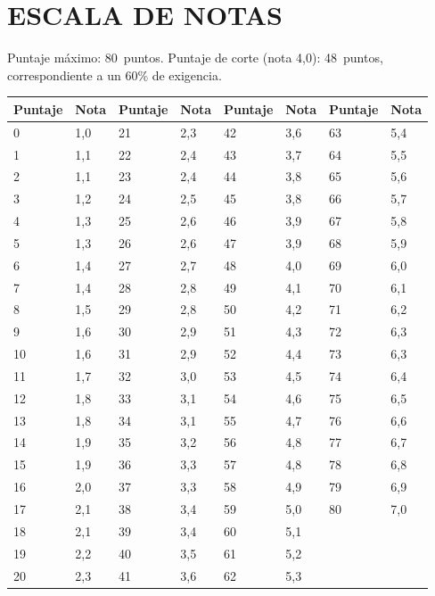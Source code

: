 \documentclass[12pt]{article}
\newcommand{\pmax}{80} %
\newcommand{\pcorte}{48} %
\begin{document}
\section*{ESCALA DE NOTAS}
\noindent
Puntaje máximo: \pmax\ puntos. Puntaje de corte (nota 4,0): \pcorte\ puntos, correspondiente a un 60\% de exigencia.
\vspace{0.3cm}
\begin{center}
\small
\begin{tabular}{|p{1.3cm}|p{1.3cm}|p{1.3cm}|p{1.3cm}|p{1.3cm}|p{1.3cm}|p{1.3cm}|p{1.3cm}| }
\hline
 Puntaje&  Nota&  Puntaje&  Nota&  Puntaje&  Nota&  Puntaje&  Nota \\ \hline
0	&	\color{red}1,0	&	21	&	\color{red}2,3	&	42	&	\color{red}3,6	&	63	&	5,4\\ \hline
1	&	\color{red}1,1	&	22	&	\color{red}2,4	&	43	&	\color{red}3,7	&	64	&	5,5\\ \hline
2	&	\color{red}1,1	&	23	&	\color{red}2,4	&	44	&	\color{red}3,8	&	65	&	5,6\\ \hline
3	&	\color{red}1,2	&	24	&	\color{red}2,5	&	45	&	\color{red}3,8	&	66	&	5,7\\ \hline
4	&	\color{red}1,3	&	25	&	\color{red}2,6	&	46	&	\color{red}3,9	&	67	&	5,8\\ \hline
5	&	\color{red}1,3	&	26	&	\color{red}2,6	&	47	&	\color{red}3,9	&	68	&	5,9\\ \hline
6	&	\color{red}1,4	&	27	&	\color{red}2,7	&	48	&	4,0	&	69	&	6,0\\ \hline
7	&	\color{red}1,4	&	28	&	\color{red}2,8	&	49	&	4,1	&	70	&	6,1\\ \hline
8	&	\color{red}1,5	&	29	&	\color{red}2,8	&	50	&	4,2	&	71	&	6,2\\ \hline
9	&	\color{red}1,6	&	30	&	\color{red}2,9	&	51	&	4,3	&	72	&	6,3\\ \hline
10	&	\color{red}1,6	&	31	&	\color{red}2,9	&	52	&	4,4	&	73	&	6,3\\ \hline
11	&	\color{red}1,7	&	32	&	\color{red}3,0	&	53	&	4,5	&	74	&	6,4\\ \hline
12	&	\color{red}1,8	&	33	&	\color{red}3,1	&	54	&	4,6	&	75	&	6,5\\ \hline
13	&	\color{red}1,8	&	34	&	\color{red}3,1	&	55	&	4,7	&	76	&	6,6\\ \hline
14	&	\color{red}1,9	&	35	&	\color{red}3,2	&	56	&	4,8	&	77	&	6,7\\ \hline
15	&	\color{red}1,9	&	36	&	\color{red}3,3	&	57	&	4,8	&	78	&	6,8\\ \hline
16	&	\color{red}2,0	&	37	&	\color{red}3,3	&	58	&	4,9	&	79	&	6,9\\ \hline
17	&	\color{red}2,1	&	38	&	\color{red}3,4	&	59	&	5,0	&	80	&	7,0\\ \hline
18	&	\color{red}2,1	&	39	&	\color{red}3,4	&	60	&	5,1	&		&	\\ \hline
19	&	\color{red}2,2	&	40	&	\color{red}3,5	&	61	&	5,2	&		&	\\ \hline
20	&	\color{red}2,3	&	41	&	\color{red}3,6	&	62	&	5,3	&		&	\\ \hline
\end{tabular}
\end{center}
\end{document}
